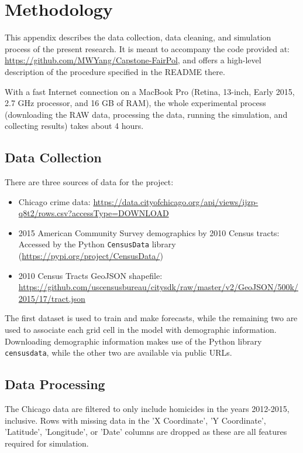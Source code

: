 \chapter{Methodology} \label{app:methodology}

This appendix describes the data collection, data cleaning, and simulation process of the present research. It is meant to accompany the code provided at: \url{https://github.com/MWYang/Capstone-FairPol}, and offers a high-level description of the procedure specified in the README there. 

With a fast Internet connection on a MacBook Pro (Retina, 13-inch, Early 2015, 2.7 GHz processor, and 16 GB of RAM), the whole experimental process (downloading the RAW data, processing the data, running the simulation, and collecting results) takes about 4 hours.

\section{Data Collection}

There are three sources of data for the project:
\begin{itemize}
    \item Chicago crime data: \url{https://data.cityofchicago.org/api/views/ijzp-q8t2/rows.csv?accessType=DOWNLOAD}
    \item 2015 American Community Survey demographics by 2010 Census tracts: Accessed by the Python \texttt{CensusData} library (\url{https://pypi.org/project/CensusData/})
    \item 2010 Census Tracts GeoJSON shapefile: \url{https://github.com/uscensusbureau/citysdk/raw/master/v2/GeoJSON/500k/2015/17/tract.json}
\end{itemize}
The first dataset is used to train \pp and make forecasts, while the remaining two are used to associate each grid cell in the \pp model with demographic information. Downloading demographic information makes use of the Python library \texttt{censusdata}, while the other two are available via public URLs.

\section{Data Processing}

The Chicago data are filtered to only include homicides in the years 2012-2015, inclusive. Rows with missing data in the 'X Coordinate', 'Y Coordinate', 'Latitude', 'Longitude', or 'Date' columns are dropped as these are all features required for simulation.

